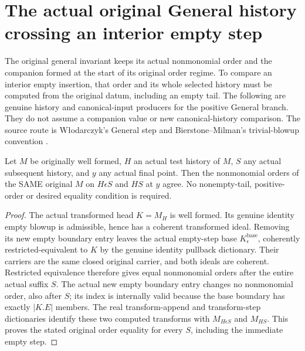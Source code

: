 \section{The actual original General history crossing an interior empty step}

The original general invariant keeps its actual nonmonomial order and
the companion formed at the start of its original order regime.  To
compare an interior empty insertion, that order and its whole selected
history must be computed from the original datum, including an empty
tail.  The following are genuine history and canonical-input producers
for the positive General branch.  They do not assume a companion value
or new canonical-history comparison.  The source route is W\l odarczyk's
General step and Bierstone--Milman's trivial-blowup convention
\cite{wlodarczyk05-hironaka,bierstone-milman08-functoriality}.

\begin{theorem}
\label{hir:original-interior-empty-all-tail-order}
\leanok
{}
Let $M$ be originally well formed, $H$ an actual test history of $M$,
$S$ any actual subsequent history, and $y$ any actual final point.  Then
the nonmonomial orders of the SAME original $M$ on $H\epsilon S$ and $HS$
at $y$ agree.  No nonempty-tail, positive-order or desired equality
condition is required.
\end{theorem}
\begin{proof}
The actual transformed head $K=M_H$ is well formed.  Its genuine identity
empty blowup is admissible, hence has a coherent transformed ideal.
Removing its new empty boundary entry leaves the actual empty-step base
$K_\epsilon^{\mathrm{base}}$, coherently restricted-equivalent to $K$
by the genuine identity pullback dictionary.  Their carriers are the same
closed original carrier, and both ideals are coherent.  Restricted
equivalence therefore gives equal nonmonomial orders after the entire
actual suffix $S$.  The actual new empty boundary entry changes no
nonmonomial order, also after $S$; its index is internally valid because
the base boundary has exactly $|K.E|$ members.  The real transform-append
and transform-step dictionaries identify these two computed transforms
with $M_{H\epsilon S}$ and $M_{HS}$.  This proves the stated original
order equality for every $S$, including the immediate empty step.
\end{proof}


